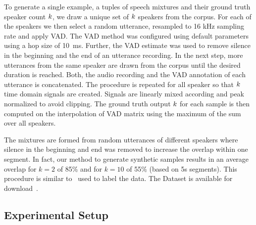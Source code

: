 \par
To generate a single example, a tuples of speech mixtures and their ground truth speaker count \(k \), we draw a unique set of \(k \) speakers from the corpus.
For each of the speakers we then select a random utterance, resampled to 16 kHz sampling rate and apply VAD.\@
The VAD method was configured using default parameters using a hop size of 10~ms.
Further, the VAD estimate was used to remove silence in the beginning and the end of an utterance recording.
In the next step, more utterances from the same speaker are drawn from the corpus until the desired duration is reached.
Both, the audio recording and the VAD annotation of each utterance is concatenated.
The procedure is repeated for all speaker so that \(k \) time domain signals are created.
Signals are linearly mixed according and peak normalized to avoid clipping.
The ground truth output \(k \) for each sample is then computed on the interpolation of VAD matrix using the maximum of the sum over all speakers.
\par
The mixtures are formed from random utterances of different speakers where silence in the beginning and end was removed to increase the overlap within one segment.
In fact, our method to generate synthetic samples results in an average overlap for \(k=2\) of 85\% and for \(k=10\) of 55\% (based on 5s segments).
This procedure is similar to~\cite{mesaros17} used to label the data.
The Dataset is available for download~\cite{oss_libricount}.

\subsection{Experimental Setup}

